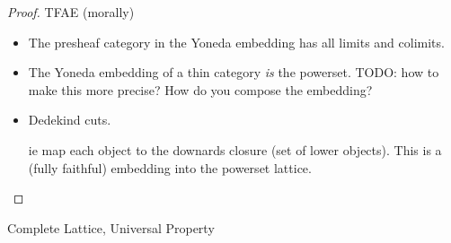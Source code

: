 \documentclass[
	fontsize=10pt, %
	twoside=false, %
	secnumdepth=-1, %
]{kaobook}
\theoremstyle{break}
\begin{document}
    \begin{proof}
        TFAE (morally)
        \begin{itemize}
            \item The presheaf category in the Yoneda embedding has all limits and colimits.
            \item The Yoneda embedding of a thin category \emph{is} the powerset. TODO: how to make this more precise? How do you compose the embedding?
            \item Dedekind cuts.
                
            ie map each object to the downards closure (set of lower objects).
            This is a (fully faithful) embedding into the powerset lattice.
        \end{itemize}
    \end{proof}

    \See Complete Lattice, Universal Property
%
%
%
%
%


\backmatter %



\printbibliography[heading=bibintoc, title=Bibliography, prenote=bibnote] %



\printindex %
\end{document}
